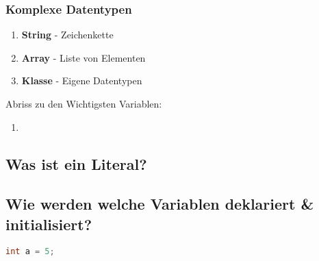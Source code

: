\documentclass[12pt, a4paper]{article}
\begin{document}
\subsubsection*{Komplexe Datentypen}
\begin{enumerate}[label=]
    \item \textbf{String} - Zeichenkette
    \item \textbf{Array} - Liste von Elementen
    \item \textbf{Klasse} - Eigene Datentypen
\end{enumerate}
Abriss zu den Wichtigsten Variablen:
\begin{enumerate}[label=]
    \item 
\end{enumerate}
\subsection*{Was ist ein Literal?}
\subsection*{Wie werden welche Variablen deklariert \& initialisiert?}
\begin{lstlisting}[language=java,title=Beispiele]
    int a = 5;    
\end{lstlisting}
\end{document}

